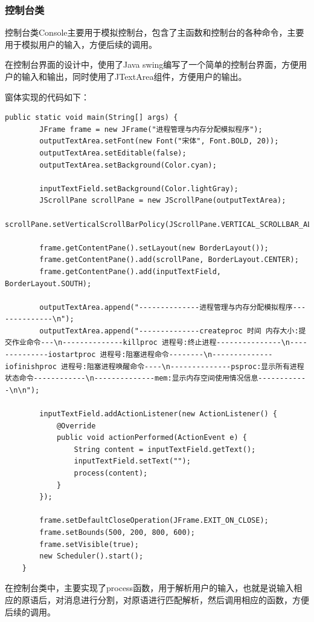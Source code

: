 \documentclass[UTF8,12pt]{article}
\begin{document}
\subsubsection{控制台类}
控制台类Console主要用于模拟控制台，包含了主函数和控制台的各种命令，主要用于模拟用户的输入，方便后续的调用。

在控制台界面的设计中，使用了Java swing编写了一个简单的控制台界面，方便用户的输入和输出，同时使用了JTextArea组件，方便用户的输出。

窗体实现的代码如下：
\begin{lstlisting}[title=窗体实现代码,frame=shadowbox]
    public static void main(String[] args) {
        JFrame frame = new JFrame("进程管理与内存分配模拟程序");
        outputTextArea.setFont(new Font("宋体", Font.BOLD, 20));
        outputTextArea.setEditable(false);
        outputTextArea.setBackground(Color.cyan);

        inputTextField.setBackground(Color.lightGray);
        JScrollPane scrollPane = new JScrollPane(outputTextArea);
        scrollPane.setVerticalScrollBarPolicy(JScrollPane.VERTICAL_SCROLLBAR_ALWAYS);

        frame.getContentPane().setLayout(new BorderLayout());
        frame.getContentPane().add(scrollPane, BorderLayout.CENTER);
        frame.getContentPane().add(inputTextField, BorderLayout.SOUTH);

        outputTextArea.append("--------------进程管理与内存分配模拟程序--------------\n");
        outputTextArea.append("--------------createproc 时间 内存大小:提交作业命令---\n--------------killproc 进程号:终止进程---------------\n--------------iostartproc 进程号:阻塞进程命令--------\n--------------iofinishproc 进程号:阻塞进程唤醒命令----\n--------------psproc:显示所有进程状态命令------------\n--------------mem:显示内存空间使用情况信息------------\n\n");

        inputTextField.addActionListener(new ActionListener() {
            @Override
            public void actionPerformed(ActionEvent e) {
                String content = inputTextField.getText();
                inputTextField.setText("");
                process(content);
            }
        });

        frame.setDefaultCloseOperation(JFrame.EXIT_ON_CLOSE);
        frame.setBounds(500, 200, 800, 600);
        frame.setVisible(true);
        new Scheduler().start();
    }
\end{lstlisting}

在控制台类中，主要实现了process函数，用于解析用户的输入，也就是说输入相应的原语后，对消息进行分割，对原语进行匹配解析，然后调用相应的函数，方便后续的调用。
\end{document}
